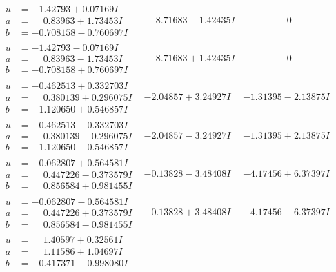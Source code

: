 \documentclass[1p]{elsarticle_modified}
\theoremstyle{definition}
\begin{document}
$$\begin{array}{c|c|c}
 \hline 
\begin{aligned}
u &= -1.42793 + 0.07169 I \\
a &= \phantom{-}0.83963 + 1.73453 I \\
b &= -0.708158 - 0.760697 I\end{aligned}
 & \phantom{-}8.71683 - 1.42435 I & \phantom{-0.000000 } 0 \\ \hline\begin{aligned}
u &= -1.42793 - 0.07169 I \\
a &= \phantom{-}0.83963 - 1.73453 I \\
b &= -0.708158 + 0.760697 I\end{aligned}
 & \phantom{-}8.71683 + 1.42435 I & \phantom{-0.000000 } 0 \\ \hline\begin{aligned}
u &= -0.462513 + 0.332703 I \\
a &= \phantom{-}0.380139 + 0.296075 I \\
b &= -1.120650 + 0.546857 I\end{aligned}
 & -2.04857 + 3.24927 I & -1.31395 - 2.13875 I \\ \hline\begin{aligned}
u &= -0.462513 - 0.332703 I \\
a &= \phantom{-}0.380139 - 0.296075 I \\
b &= -1.120650 - 0.546857 I\end{aligned}
 & -2.04857 - 3.24927 I & -1.31395 + 2.13875 I \\ \hline\begin{aligned}
u &= -0.062807 + 0.564581 I \\
a &= \phantom{-}0.447226 - 0.373579 I \\
b &= \phantom{-}0.856584 + 0.981455 I\end{aligned}
 & -0.13828 - 3.48408 I & -4.17456 + 6.37397 I \\ \hline\begin{aligned}
u &= -0.062807 - 0.564581 I \\
a &= \phantom{-}0.447226 + 0.373579 I \\
b &= \phantom{-}0.856584 - 0.981455 I\end{aligned}
 & -0.13828 + 3.48408 I & -4.17456 - 6.37397 I \\ \hline\begin{aligned}
u &= \phantom{-}1.40597 + 0.32561 I \\
a &= \phantom{-}1.11586 + 1.04697 I \\
b &= -0.417371 - 0.998080 I\end{aligned}

\end{array}$$
\end{document}
